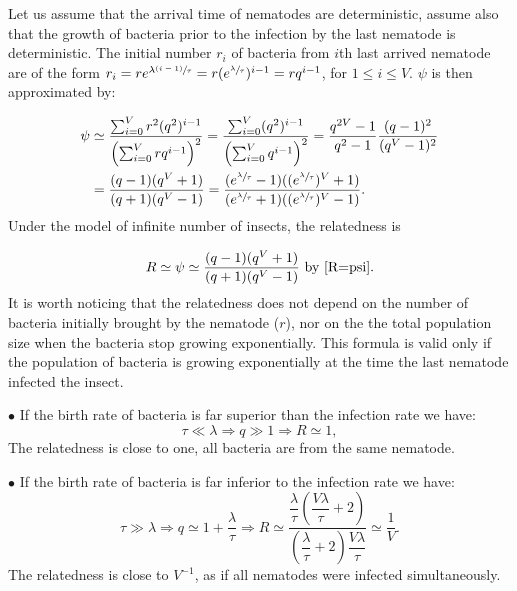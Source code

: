 \documentclass{article}
\begin{document}
 
 Let us assume that the arrival time of nematodes are deterministic, assume also that the growth of bacteria prior to the infection by the last nematode is deterministic. The initial number $r_i$ of bacteria from $i$th last arrived nematode are of the form $r_i=r e^{\lambda \sfrac{ (i-1) }{\tau}}=r (e^{\sfrac{ \lambda}{\tau}})^{i-1}=r q^{i-1}$, for $ 1 \leq i \leq V$.
 $\psi$ is then approximated by: 
 
 \begin{align}
  \psi &\simeq \dfrac{ \sum_{i=0}^V r^2 (q^2)^{i-1}}{\left(\sum_{i=0}^V r q^{i-1}\right)^2} = \dfrac{ \sum_{i=0}^V (q^2)^{i-1}}{\left(\sum_{i=0}^V q^{i-1}\right)^2}= \dfrac{q^{2V} -1 }{q^{2} -1 } \dfrac{(q-1)^2}{(q^V -1)^2} \\
  &= \dfrac{(q-1)(q^V +1)}{(q+1)(q^V -1)} = \dfrac{(e^{\sfrac{ \lambda}{\tau}}-1)((e^{\sfrac{ \lambda}{\tau}})^V +1)}{(e^{\sfrac{ \lambda}{\tau}}+1)((e^{\sfrac{ \lambda}{\tau}})^V -1)}.
 \end{align}
 Under the model of infinite number of insects, the relatedness is 
 
 \begin{equation}
 R \simeq \psi \simeq  \dfrac{(q-1)(q^V +1)}{(q+1)(q^V -1)} \text{ by }\ref{R=psi}.
 \end{equation}
 It is worth noticing that the relatedness does not depend on the number of bacteria initially brought by the nematode ($r$), nor on the the total population size when the bacteria stop growing exponentially. 
 This formula is valid only if the population of bacteria is growing exponentially at the time the last nematode infected the insect.
 
 $\bullet$ If the birth rate of bacteria is far superior than the infection rate we have:
 \begin{equation}
 \tau \ll \lambda \Rightarrow q \gg 1 \Rightarrow R \simeq 1,
 \end{equation}
 The relatedness is close to one, all bacteria are from the same nematode.
 
 
 $\bullet$ If the birth rate of bacteria is far inferior to the infection rate we have:
 \begin{equation}
 \tau \gg \lambda \Rightarrow q \simeq 1 + \frac{\lambda }{\tau } \Rightarrow R \simeq 
  \dfrac{\dfrac{\lambda}{\tau}\left( \dfrac{V\lambda}{\tau} +2\right)}{\left( \dfrac{\lambda}{\tau} +2\right)\dfrac{V\lambda}{\tau}} \simeq \dfrac{1}{V}.
 \end{equation}
  The relatedness is close to $V^{-1}$, as if all nematodes were infected simultaneously.
  
\end{document}
